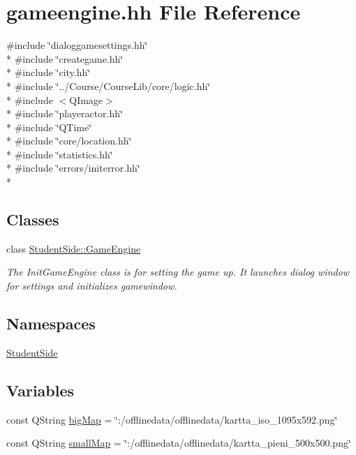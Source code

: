 \hypertarget{gameengine_8hh}{\section{gameengine.\-hh File Reference}
\label{gameengine_8hh}
}
{\ttfamily \#include \char`\"{}dialoggamesettings.\-hh\char`\"{}}\\*
{\ttfamily \#include \char`\"{}creategame.\-hh\char`\"{}}\\*
{\ttfamily \#include \char`\"{}city.\-hh\char`\"{}}\\*
{\ttfamily \#include \char`\"{}../\-Course/\-Course\-Lib/core/logic.\-hh\char`\"{}}\\*
{\ttfamily \#include $<$Q\-Image$>$}\\*
{\ttfamily \#include \char`\"{}playeractor.\-hh\char`\"{}}\\*
{\ttfamily \#include \char`\"{}Q\-Time\char`\"{}}\\*
{\ttfamily \#include \char`\"{}core/location.\-hh\char`\"{}}\\*
{\ttfamily \#include \char`\"{}statistics.\-hh\char`\"{}}\\*
{\ttfamily \#include \char`\"{}errors/initerror.\-hh\char`\"{}}\\*
\subsection*{Classes}
\begin{DoxyCompactItemize}
\item 
class \hyperlink{class_student_side_1_1_game_engine}{Student\-Side\-::\-Game\-Engine}
\begin{DoxyCompactList}\small\item\em The Init\-Game\-Engine class is for setting the game up. It launches dialog window for settings and initializes gamewindow. \end{DoxyCompactList}\end{DoxyCompactItemize}
\subsection*{Namespaces}
\begin{DoxyCompactItemize}
\item 
\hyperlink{namespace_student_side}{Student\-Side}
\end{DoxyCompactItemize}
\subsection*{Variables}
\begin{DoxyCompactItemize}
\item 
const Q\-String \hyperlink{gameengine_8hh_ad6494001dd20d6bedc7543fec6c695ba}{big\-Map} = \char`\"{}\-:/offlinedata/offlinedata/kartta\-\_\-iso\-\_\-1095x592.\-png\char`\"{}
\item 
const Q\-String \hyperlink{gameengine_8hh_af60fadacdd8d88e839ee0eae05d28518}{small\-Map} = \char`\"{}\-:/offlinedata/offlinedata/kartta\-\_\-pieni\-\_\-500x500.\-png\char`\"{}
\end{DoxyCompactItemize}


